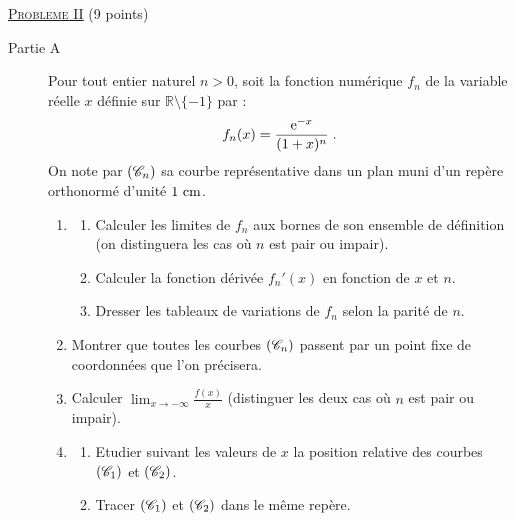 \noindent \underline{\textsc{Probleme II}} (9 points)%
      \begin{description}
            \item[Partie A]
                  Pour tout entier naturel $n>0$, soit la fonction num\'erique $f_n$ de la variable r\'eelle $x$ d\'efinie sur 
                  $\mathbb{R} \setminus \{-1\}$ par : 
                  \[
                        f_n (x) = \frac{\mathrm{e}^{-x}}{(1+x)^n} \;.
                  \]
                  On note par $(\mathscr{C}_n)$ sa courbe repr\'esentative 
                  dans un plan muni d'un rep\`ere orthonorm\'e \Oij{} d'unit\'e $1~\mathrm{cm}$.
                  \begin{enumerate}
                        \item \begin{enumerate}
                                    \item Calculer les limites de $f_n$ aux bornes de son ensemble de d\'efinition
                                          (on distinguera les cas o\`u $n$ est pair ou impair).
                                    \item Calculer la fonction d\'eriv\'ee $f_n'(x)$ en fonction de $x$ et $n$.
                                    \item Dresser les tableaux de variations de $f_n$ selon la parit\'e de $n$.
                              \end{enumerate}
                        \item Montrer que toutes les courbes $(\mathscr{C}_n)$ passent par un point fixe de coordonn\'ees que 
                              l'on pr\'ecisera.
                        \item Calculer $\displaystyle{\lim_{x\rightarrow -\infty} \frac{f(x)}{x}}$
                              (distinguer les deux cas o\`u $n$ est pair ou impair).
                        \item \begin{enumerate}
                                    \item Etudier suivant les valeurs de $x$ 
                                          la position relative des courbes $(\mathscr{C}_1)$ et $(\mathscr{C}_2)$.
                                    \item Tracer $(\mathscr{C}_1)$ et $(\mathscr{C}_2)$ dans le m\^eme rep\`ere.
                              \end{enumerate}

\end{enumerate}
\end{description}
